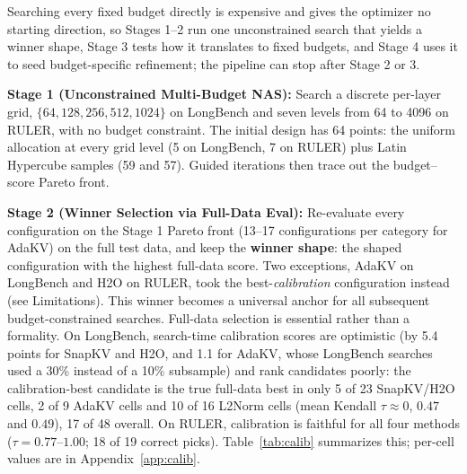 \documentclass[11pt]{article}
\begin{document}
Searching every fixed budget directly is expensive and gives the optimizer no starting direction, so Stages 1--2 run one unconstrained search that yields a winner shape, Stage 3 tests how it translates to fixed budgets, and Stage 4 uses it to seed budget-specific refinement; the pipeline can stop after Stage 2 or 3.

\textbf{Stage 1 (Unconstrained Multi-Budget NAS):} Search a discrete per-layer grid, $\{64,128,256,512,1024\}$ on LongBench and seven levels from 64 to 4096 on RULER, with no budget constraint. The initial design has 64 points: the uniform allocation at every grid level (5 on LongBench, 7 on RULER) plus Latin Hypercube samples (59 and 57). Guided iterations then trace out the budget--score Pareto front.

\textbf{Stage 2 (Winner Selection via Full-Data Eval):} Re-evaluate every configuration on the Stage 1 Pareto front (13--17 configurations per category for AdaKV) on the full test data, and keep the \textbf{winner shape}: the shaped configuration with the highest full-data score. Two exceptions, AdaKV on LongBench and H2O on RULER, took the best-\emph{calibration} configuration instead (see Limitations). This winner becomes a universal anchor for all subsequent budget-constrained searches. Full-data selection is essential rather than a formality. On LongBench, search-time calibration scores are optimistic (by 5.4 points for SnapKV and H2O, and 1.1 for AdaKV, whose LongBench searches used a 30\% instead of a 10\% subsample) and rank candidates poorly: the calibration-best candidate is the true full-data best in only 5 of 23 SnapKV/H2O cells, 2 of 9 AdaKV cells and 10 of 16 L2Norm cells (mean Kendall $\tau \approx 0$, $0.47$ and $0.49$), 17 of 48 overall. On RULER, calibration is faithful for all four methods ($\tau = 0.77$--$1.00$; 18 of 19 correct picks). Table~\ref{tab:calib} summarizes this; per-cell values are in Appendix~\ref{app:calib}.
\end{document}
